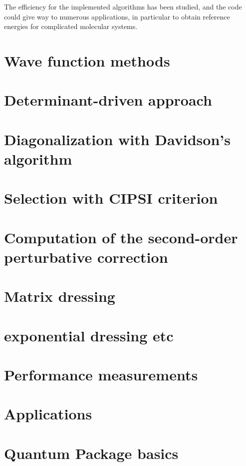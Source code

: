 \documentclass[12pt,a4paper]{report}
\begin{document}
The efficiency for the implemented algorithms has been studied, and the code could give way to numerous applications, in particular to obtain reference energies for complicated molecular systems.



\chapter{Wave function methods}
\minitoc



\chapter{Determinant-driven approach}
\minitoc


\chapter{Diagonalization with Davidson's algorithm}
\minitoc


\chapter{Selection with CIPSI criterion}
\minitoc


\chapter{Computation of the second-order perturbative correction}

\minitoc



\chapter{Matrix dressing}
\minitoc



\chapter{exponential dressing etc}


\chapter{Performance measurements}


\chapter{Applications}






\appendix 

\chapter{Quantum Package basics}
\minitoc

\end{document}
